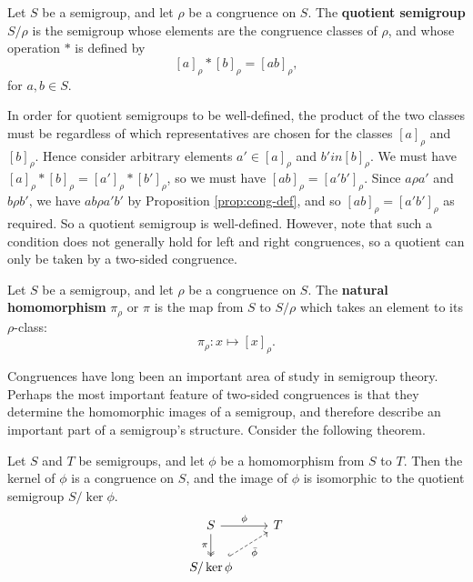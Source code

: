 \begin{definition}
  \label{def:quotient}
  Let $S$ be a semigroup, and let $\rho$ be a congruence on $S$.  The
  \textbf{quotient semigroup} $S / \rho$ is the semigroup whose elements are the
  congruence classes of $\rho$, and whose operation $*$ is defined by
  $$[a]_\rho * [b]_\rho = [ab]_\rho,$$
  for $a, b \in S$.
\end{definition}

In order for quotient semigroups to be well-defined, the product of the two
classes must be regardless of which representatives are chosen for the classes
$[a]_\rho$ and $[b]_\rho$.  Hence consider arbitrary elements $a' \in [a]_\rho$
and $b' in [b]_\rho$.  We must have
$[a]_\rho * [b]_\rho = [a']_\rho * [b']_\rho$, so we must have
$[ab]_\rho = [a'b']_\rho$.  Since $a \rho a'$ and $b \rho b'$, we have
$ab \rho a'b'$ by Proposition \ref{prop:cong-def}, and so
$[ab]_\rho = [a'b']_\rho$ as required.  So a quotient semigroup is well-defined.
However, note that such a condition does not generally hold for left and right
congruences, so a quotient can only be taken by a two-sided congruence.

\begin{definition}
  \label{def:natural-homomorphism}
  Let $S$ be a semigroup, and let $\rho$ be a congruence on $S$.  The
  \textbf{natural homomorphism} $\pi_\rho$ or $\pi$ is the map from $S$ to
  $S / \rho$ which takes an element to its $\rho$-class:
  $$\pi_\rho: x \mapsto [x]_\rho.$$
\end{definition}

Congruences have long been an important area of study in semigroup theory.
Perhaps the most important feature of two-sided congruences is that they
determine the homomorphic images of a semigroup, and therefore describe an
important part of a semigroup's structure.  Consider the following theorem.

\begin{theorem}
  \label{thm:first-isomorphism}
  Let $S$ and $T$ be semigroups, and let $\phi$ be a homomorphism from $S$ to
  $T$.  Then the kernel of $\phi$ is a congruence on $S$, and the image of
  $\phi$ is isomorphic to the quotient semigroup $S / \ker{\phi}$.
  $$
  \begin{tikzcd}
    S \ar[d, two heads, "\pi"'] \ar[r, "\phi"] & T \\
    S / \ker{\phi} \ar[ur, dashed, hook, "\bar\phi"']
  \end{tikzcd}
  $$
\end{theorem}

